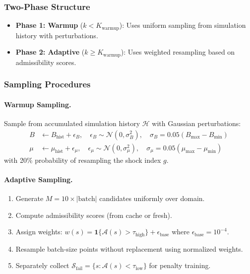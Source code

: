 \subsubsection{Two-Phase Structure}
\begin{itemize}
    \item \textbf{Phase 1: Warmup} ($k < K_{\text{warmup}}$): Uses uniform sampling from simulation history with perturbations.
    \item \textbf{Phase 2: Adaptive} ($k \geq K_{\text{warmup}}$): Uses weighted resampling based on admissibility scores.
\end{itemize}

\subsubsection{Sampling Procedures}

\paragraph{Warmup Sampling.}
Sample from accumulated simulation history $\mathcal{H}$ with Gaussian perturbations:
\begin{align}
    B &\leftarrow B_{\text{hist}} + \epsilon_B, \quad \epsilon_B \sim \mathcal{N}(0, \sigma_B^2), \quad \sigma_B = 0.05(B_{\max} - B_{\min}) \\
    \mu &\leftarrow \mu_{\text{hist}} + \epsilon_\mu, \quad \epsilon_\mu \sim \mathcal{N}(0, \sigma_\mu^2), \quad \sigma_\mu = 0.05(\mu_{\max} - \mu_{\min})
\end{align}
with 20\% probability of resampling the shock index $g$.

\paragraph{Adaptive Sampling.}
\begin{enumerate}
    \item Generate $M = 10 \times |\text{batch}|$ candidates uniformly over domain.
    \item Compute admissibility scores (from cache or fresh).
    \item Assign weights: $w(s) = \mathbf{1}\{\mathcal{A}(s) > \tau_{\text{high}}\} + \epsilon_{\text{base}}$ where $\epsilon_{\text{base}} = 10^{-4}$.
    \item Resample batch-size points without replacement using normalized weights.
    \item Separately collect $\mathcal{S}_{\text{fail}} = \{s : \mathcal{A}(s) < \tau_{\text{low}}\}$ for penalty training.
\end{enumerate}


